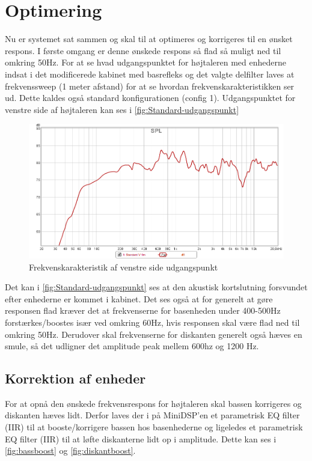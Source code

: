 \section{Optimering}
Nu er systemet sat sammen og skal til at optimeres og korrigeres til en ønsket respons. I første omgang er denne ønskede respons så flad så muligt ned til omkring 50Hz. For at se hvad udgangspunktet for højtaleren med enhederne indsat i det modificerede kabinet med basrefleks og det valgte delfilter laves at frekvenssweep (1 meter afstand) for at se hvordan frekvenskarakteristikken ser ud. Dette kaldes også standard konfigurationen (config 1).  
Udgangspunktet for venstre side af højtaleren kan ses i \autoref*{fig:Standard-udgangspunkt}

\begin{figure}[H] 
	\center
	\includegraphics[width=1\linewidth]{figur/Standard-udgangspunkt}\quad
	\caption{Frekvenskarakteristik af venstre side udgangspunkt}
	\label{fig:Standard-udgangspunkt}
\end{figure}

Det kan i \autoref{fig:Standard-udgangspunkt} ses at den akustisk kortslutning forsvundet efter enhederne er kommet i kabinet. Det ses også at for generelt at gøre responsen flad kræver det at frekvenserne for basenheden under 400-500Hz forstærkes/boostes især ved omkring 60Hz, hvis responsen skal være flad ned til omkring 50Hz. Derudover skal frekvenserne for diskanten generelt også hæves en smule, så det udligner det amplitude peak mellem 600hz og 1200 Hz. 


\subsection{Korrektion af enheder}
For at opnå den ønskede frekvensrespons for højtaleren skal bassen korrigeres og diskanten hæves lidt. Derfor laves der i på MiniDSP'en et parametrisk EQ filter (IIR) til at booste/korrigere bassen hos basenhederne og ligeledes et parametrisk EQ filter (IIR) til at løfte diskanterne lidt op i amplitude. Dette kan ses i \autoref{fig:bassboost} og \autoref{fig:diskantboost}. 

